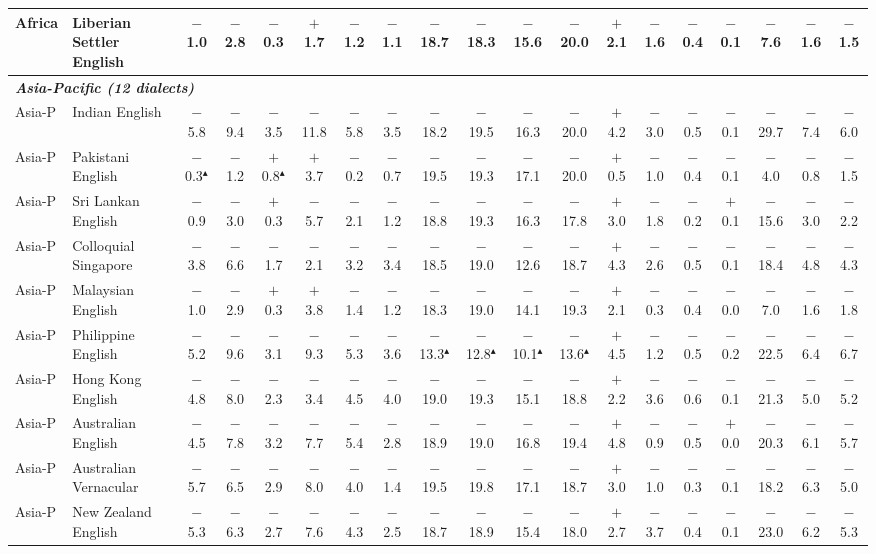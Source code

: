 \begin{table}[t]
\begin{tabular}{llccccccccccccccccc}
Africa & Liberian Settler English & $-$1.0 & $-$2.8 & $-$0.3 & $+$1.7 & $-$1.2 & $-$1.1 & $-$18.7 & $-$18.3 & $-$15.6 & $-$20.0 & $+$2.1 & $-$1.6 & $-$0.4 & $-$0.1 & $-$7.6 & $-$1.6 & $-$1.5 \\
\midrule
\multicolumn{19}{l}{\textit{\textbf{Asia-Pacific (12 dialects)}}} \\
Asia-P & Indian English & $-$5.8 & $-$9.4 & $-$3.5 & $-$11.8 & $-$5.8 & $-$3.5 & $-$18.2 & $-$19.5 & $-$16.3 & $-$20.0 & $+$4.2 & $-$3.0 & $-$0.5 & $-$0.1 & $-$29.7 & $-$7.4 & $-$6.0 \\
Asia-P & Pakistani English & $-$0.3$^\blacktriangle$ & $-$1.2 & $+$0.8$^\blacktriangle$ & $+$3.7 & $-$0.2 & $-$0.7 & $-$19.5 & $-$19.3 & $-$17.1 & $-$20.0 & $+$0.5 & $-$1.0 & $-$0.4 & $-$0.1 & $-$4.0 & $-$0.8 & $-$1.5 \\
Asia-P & Sri Lankan English & $-$0.9 & $-$3.0 & $+$0.3 & $-$5.7 & $-$2.1 & $-$1.2 & $-$18.8 & $-$19.3 & $-$16.3 & $-$17.8 & $+$3.0 & $-$1.8 & $-$0.2 & $+$0.1 & $-$15.6 & $-$3.0 & $-$2.2 \\
Asia-P & Colloquial Singapore & $-$3.8 & $-$6.6 & $-$1.7 & $-$2.1 & $-$3.2 & $-$3.4 & $-$18.5 & $-$19.0 & $-$12.6 & $-$18.7 & $+$4.3 & $-$2.6 & $-$0.5 & $-$0.1 & $-$18.4 & $-$4.8 & $-$4.3 \\
Asia-P & Malaysian English & $-$1.0 & $-$2.9 & $+$0.3 & $+$3.8 & $-$1.4 & $-$1.2 & $-$18.3 & $-$19.0 & $-$14.1 & $-$19.3 & $+$2.1 & $-$0.3 & $-$0.4 & $-$0.0 & $-$7.0 & $-$1.6 & $-$1.8 \\
Asia-P & Philippine English & $-$5.2 & $-$9.6 & $-$3.1 & $-$9.3 & $-$5.3 & $-$3.6 & $-$13.3$^\blacktriangle$ & $-$12.8$^\blacktriangle$ & $-$10.1$^\blacktriangle$ & $-$13.6$^\blacktriangle$ & $+$4.5 & $-$1.2 & $-$0.5 & $-$0.2 & $-$22.5 & $-$6.4 & $-$6.7 \\
Asia-P & Hong Kong English & $-$4.8 & $-$8.0 & $-$2.3 & $-$3.4 & $-$4.5 & $-$4.0 & $-$19.0 & $-$19.3 & $-$15.1 & $-$18.8 & $+$2.2 & $-$3.6 & $-$0.6 & $-$0.1 & $-$21.3 & $-$5.0 & $-$5.2 \\
Asia-P & Australian English & $-$4.5 & $-$7.8 & $-$3.2 & $-$7.7 & $-$5.4 & $-$2.8 & $-$18.9 & $-$19.0 & $-$16.8 & $-$19.4 & $+$4.8 & $-$0.9 & $-$0.5 & $+$0.0 & $-$20.3 & $-$6.1 & $-$5.7 \\
Asia-P & Australian Vernacular & $-$5.7 & $-$6.5 & $-$2.9 & $-$8.0 & $-$4.0 & $-$1.4 & $-$19.5 & $-$19.8 & $-$17.1 & $-$18.7 & $+$3.0 & $-$1.0 & $-$0.3 & $-$0.1 & $-$18.2 & $-$6.3 & $-$5.0 \\
Asia-P & New Zealand English & $-$5.3 & $-$6.3 & $-$2.7 & $-$7.6 & $-$4.3 & $-$2.5 & $-$18.7 & $-$18.9 & $-$15.4 & $-$18.0 & $+$2.7 & $-$3.7 & $-$0.4 & $-$0.1 & $-$23.0 & $-$6.2 & $-$5.3 \\

\end{tabular}
\end{table}
